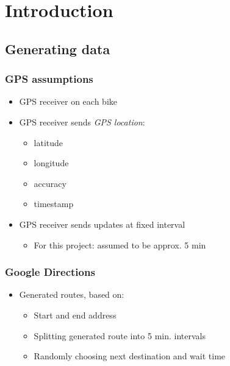 \section{Introduction}

\subsection{Generating data}

\begin{frame}
\frametitle{GPS assumptions}

\begin{itemize}
\item GPS receiver on each bike
\item GPS receiver sends \textit{GPS location}:
  \begin{itemize}
  \item latitude
  \item longitude
  \item accuracy
  \item timestamp
  \end{itemize}
\item GPS receiver sends updates at fixed interval
  \begin{itemize}
  \item For this project: assumed to be approx. 5 min
  \end{itemize}
\end{itemize}

\end{frame}

\begin{frame}
\frametitle{Google Directions}

\begin{itemize}
\item Generated routes, based on:
  \begin{itemize}
  \item Start and end address
  \item Splitting generated route into 5 min. intervals
  \item Randomly choosing next destination and wait time
  \end{itemize}
\end{itemize}

\end{frame}
